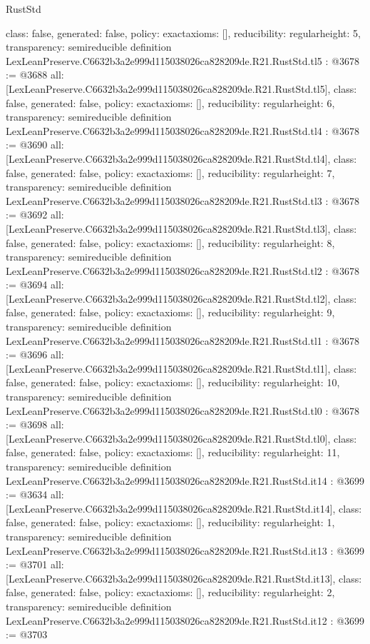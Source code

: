 \begin{lexlean}{RustStd}
\begin{coremodule}
{  class: false,
  generated: false,
  policy: exact{axioms: []},
  reducibility: regular{height: 5},
  transparency: semireducible
}
definition LexLeanPreserve.C6632b3a2e999d115038026ca828209de.R21.RustStd.tl5 : @3678 := @3688 {
  all: [LexLeanPreserve.C6632b3a2e999d115038026ca828209de.R21.RustStd.tl5],
  class: false,
  generated: false,
  policy: exact{axioms: []},
  reducibility: regular{height: 6},
  transparency: semireducible
}
definition LexLeanPreserve.C6632b3a2e999d115038026ca828209de.R21.RustStd.tl4 : @3678 := @3690 {
  all: [LexLeanPreserve.C6632b3a2e999d115038026ca828209de.R21.RustStd.tl4],
  class: false,
  generated: false,
  policy: exact{axioms: []},
  reducibility: regular{height: 7},
  transparency: semireducible
}
definition LexLeanPreserve.C6632b3a2e999d115038026ca828209de.R21.RustStd.tl3 : @3678 := @3692 {
  all: [LexLeanPreserve.C6632b3a2e999d115038026ca828209de.R21.RustStd.tl3],
  class: false,
  generated: false,
  policy: exact{axioms: []},
  reducibility: regular{height: 8},
  transparency: semireducible
}
definition LexLeanPreserve.C6632b3a2e999d115038026ca828209de.R21.RustStd.tl2 : @3678 := @3694 {
  all: [LexLeanPreserve.C6632b3a2e999d115038026ca828209de.R21.RustStd.tl2],
  class: false,
  generated: false,
  policy: exact{axioms: []},
  reducibility: regular{height: 9},
  transparency: semireducible
}
definition LexLeanPreserve.C6632b3a2e999d115038026ca828209de.R21.RustStd.tl1 : @3678 := @3696 {
  all: [LexLeanPreserve.C6632b3a2e999d115038026ca828209de.R21.RustStd.tl1],
  class: false,
  generated: false,
  policy: exact{axioms: []},
  reducibility: regular{height: 10},
  transparency: semireducible
}
definition LexLeanPreserve.C6632b3a2e999d115038026ca828209de.R21.RustStd.tl0 : @3678 := @3698 {
  all: [LexLeanPreserve.C6632b3a2e999d115038026ca828209de.R21.RustStd.tl0],
  class: false,
  generated: false,
  policy: exact{axioms: []},
  reducibility: regular{height: 11},
  transparency: semireducible
}
definition LexLeanPreserve.C6632b3a2e999d115038026ca828209de.R21.RustStd.it14 : @3699 := @3634 {
  all: [LexLeanPreserve.C6632b3a2e999d115038026ca828209de.R21.RustStd.it14],
  class: false,
  generated: false,
  policy: exact{axioms: []},
  reducibility: regular{height: 1},
  transparency: semireducible
}
definition LexLeanPreserve.C6632b3a2e999d115038026ca828209de.R21.RustStd.it13 : @3699 := @3701 {
  all: [LexLeanPreserve.C6632b3a2e999d115038026ca828209de.R21.RustStd.it13],
  class: false,
  generated: false,
  policy: exact{axioms: []},
  reducibility: regular{height: 2},
  transparency: semireducible
}
definition LexLeanPreserve.C6632b3a2e999d115038026ca828209de.R21.RustStd.it12 : @3699 := @3703 {
}
\end{coremodule}
\end{lexlean}
